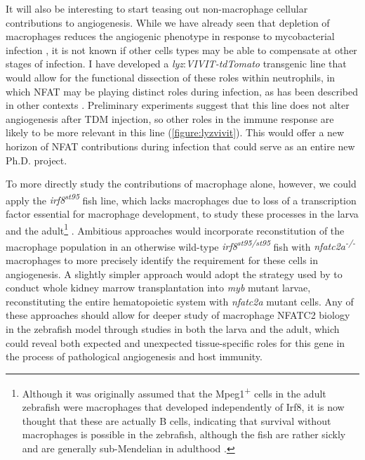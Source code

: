 It will also be interesting to start teasing out non\hyp{}macrophage cellular contributions to angiogenesis. While we have already seen that depletion of macrophages reduces the angiogenic phenotype in response to mycobacterial infection \citep{Oehlers2015}, it is not known if other cells types may be able to compensate at other stages of infection. I have developed a \textit{lyz}:\textit{VIVIT\hyp{}tdTomato} transgenic line that would allow for the functional dissection of these roles within neutrophils, in which NFAT may be playing distinct roles during infection, as has been described in other contexts \citep{Herbst2015, Vymazal2021, Vega2007}. Preliminary experiments suggest that this line does not alter angiogenesis after TDM injection, so other roles in the immune response are likely to be more relevant in this line (\autoref{figure:lyzvivit}). This would offer a new horizon of NFAT contributions during infection that could serve as an entire new Ph.D. project.

To more directly study the contributions of macrophage alone, however, we could apply the \textit{irf8\textsuperscript{st95}} fish line, which lacks macrophages due to loss of a transcription factor essential for macrophage development, to study these processes in the larva and the adult\footnote{Although it was originally assumed that the Mpeg1\textsuperscript{+} cells in the adult zebrafish were macrophages that developed independently of Irf8, it is now thought that these are actually B cells, indicating that survival without macrophages is possible in the zebrafish, although the fish are rather sickly and are generally sub\hyp{}Mendelian in adulthood \citep{Ferrero2020}.} \citep{Shiau2015, Xu2012, Tamura2005}. Ambitious approaches would incorporate reconstitution of the macrophage population in an otherwise wild\hyp{}type \textit{irf8\textsuperscript{st95/st95}} fish with \textit{nfatc2a\textsuperscript{\hyp{}/\hyp{}}} macrophages to more precisely identify the requirement for these cells in angiogenesis. A slightly simpler approach would adopt the strategy used by \citet{Cronan2021} to conduct whole kidney marrow transplantation into \textit{myb} mutant larvae, reconstituting the entire hematopoietic system with \textit{nfatc2a} mutant cells. Any of these approaches should allow for deeper study of macrophage NFATC2 biology in the zebrafish model through studies in both the larva and the adult, which could reveal both expected and unexpected tissue\hyp{}specific roles for this gene in the process of pathological angiogenesis and host immunity.

